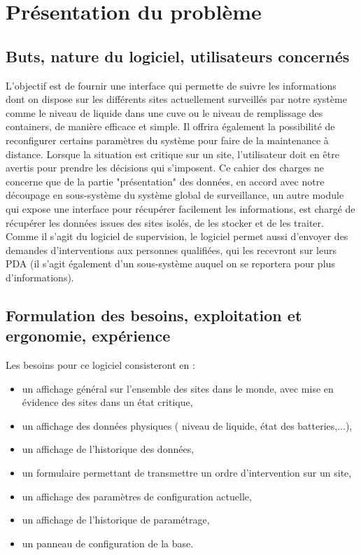 \section{Présentation du problème}
\subsection{Buts, nature du logiciel, utilisateurs concernés}
L'objectif est de fournir une interface qui permette de suivre les informations dont on dispose sur les différents sites actuellement surveillés par notre système comme le niveau de liquide dans une cuve ou le niveau de remplissage des containers, de manière efficace et simple. Il offrira également la possibilité de reconfigurer certains paramètres du système pour faire de la maintenance à distance.
Lorsque la situation est critique sur un site, l'utilisateur doit en être avertis pour prendre les décisions qui s'imposent.
Ce cahier des charges ne concerne que de la partie "présentation" des données, en accord avec notre découpage en sous-système du système global de surveillance, un autre module  qui expose une interface pour récupérer facilement les informations, est chargé de récupérer les données issues des sites isolés, de les stocker et de les traiter.
Comme il s'agit du logiciel de supervision, le logiciel permet aussi d'envoyer des demandes d'interventions aux personnes qualifiées, qui les recevront sur leurs PDA (il s'agit également d'un sous-système auquel on se reportera pour plus d'informations).

\subsection{Formulation des besoins, exploitation et ergonomie, expérience}
Les besoins pour ce logiciel consisteront en :
\begin{itemize}
	\item un affichage général sur l'ensemble des sites dans le monde, avec mise en évidence des sites dans un état critique,
	\item un affichage des données physiques ( niveau de liquide, état des batteries,...),
	\item un affichage de l'historique des données,
	\item un formulaire permettant de transmettre un ordre d'intervention sur un site,
	\item un affichage des paramètres de configuration actuelle,
	\item un affichage de l'historique de paramétrage,
	\item un panneau de configuration de la base.
\end{itemize}

